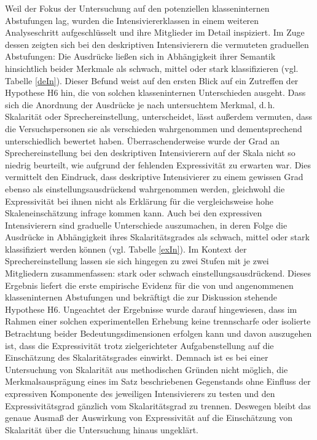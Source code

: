 Weil der Fokus der Untersuchung auf den potenziellen klasseninternen Abstufungen lag, wurden die Intensiviererklassen in einem weiteren Analyseschritt aufgeschlüsselt und ihre Mitglieder im Detail inspiziert. Im Zuge dessen zeigten sich bei den deskriptiven Intensivierern die vermuteten graduellen Abstufungen: Die Ausdrücke ließen sich in Abhängigkeit ihrer Semantik hinsichtlich beider Merkmale als schwach, mittel oder stark klassifizieren (vgl. Tabelle \ref{deIn}). Dieser Befund weist auf den ersten Blick auf ein Zutreffen der Hypothese H6 hin, die von solchen klasseninternen Unterschieden ausgeht. Dass sich die Anordnung der Ausdrücke je nach untersuchtem Merkmal, d.\,h. Skalarität oder Sprechereinstellung, unterscheidet, lässt außerdem vermuten, dass die Versuchspersonen sie als verschieden wahrgenommen und dementsprechend unterschiedlich bewertet haben. Überraschenderweise wurde der Grad an Sprechereinstellung bei den deskriptiven Intensivierern auf der Skala nicht so niedrig beurteilt, wie aufgrund der fehlenden Expressivität zu erwarten war. Dies vermittelt den Eindruck, dass deskriptive Intensivierer zu einem gewissen Grad ebenso als einstellungsausdrückend wahrgenommen werden, gleichwohl die Expressivität bei ihnen nicht als Erklärung für die vergleichsweise hohe Skaleneinschätzung infrage kommen kann. Auch bei den expressiven Intensivierern sind graduelle Unterschiede auszumachen, in deren Folge die Ausdrücke in Abhängigkeit ihres Skalaritätsgrades als schwach, mittel oder stark klassifiziert werden können (vgl. Tabelle \ref{exIn}). Im Kontext der Sprechereinstellung lassen sie sich hingegen zu zwei Stufen mit je zwei Mitgliedern zusammenfassen: stark oder schwach einstellungsausdrückend. Dieses Ergebnis liefert die erste empirische Evidenz für die von \citet[87]{Biedermann.1969} und \citet[408]{Breindl.2007} angenommenen klasseninternen Abstufungen und bekräftigt die zur Diskussion stehende Hypothese H6. Ungeachtet der Ergebnisse wurde darauf hingewiesen, dass im Rahmen einer solchen experimentellen Erhebung keine trennscharfe oder isolierte Betrachtung beider Bedeutungsdimensionen erfolgen kann und davon auszugehen ist, dass die Expressivität trotz zielgerichteter Aufgabenstellung auf die Einschätzung des Skalaritätsgrades einwirkt. Demnach ist es bei einer Untersuchung von Skalarität aus methodischen Gründen nicht möglich, die Merkmalsausprägung eines im Satz beschriebenen Gegenstands ohne Einfluss der expressiven Komponente des jeweiligen Intensivierers zu testen und den Expressivitätsgrad gänzlich vom Skalaritätsgrad zu trennen. Deswegen bleibt das genaue Ausmaß der Auswirkung von Expressivität auf die Einschätzung von Skalarität über die Untersuchung hinaus ungeklärt.


